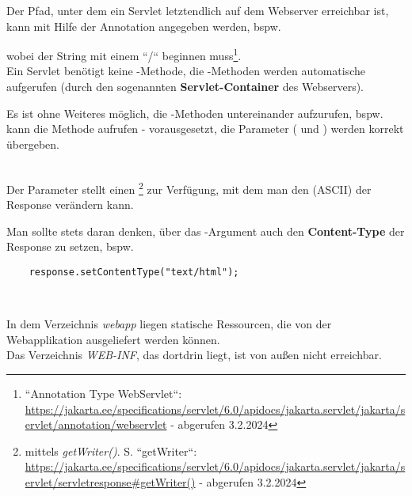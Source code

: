 \noindent
Der Pfad, unter dem ein Servlet letztendlich auf dem Webserver erreichbar ist, kann mit Hilfe der Annotation  angegeben werden, bspw. \begin{center}\end{center} wobei der String mit einem ``/`` beginnen muss\footnote{
    ``Annotation Type WebServlet``: \url{https://jakarta.ee/specifications/servlet/6.0/apidocs/jakarta.servlet/jakarta/servlet/annotation/webservlet} - abgerufen 3.2.2024
}.\\

\noindent
Ein Servlet benötigt keine -Methode, die -Methoden werden automatische aufgerufen (durch den sogenannten \textbf{Servlet-Container} des Webservers).

\begin{tcolorbox}[enlarge top by=0.5cm,enlarge bottom by=0.5cm]
    Es ist ohne Weiteres möglich, die -Methoden untereinander aufzurufen, bspw. kann  die Methode  aufrufen - vorausgesetzt, die Parameter ( und ) werden korrekt übergeben.
\end{tcolorbox}\\

\noindent
Der Parameter  stellt einen \footnote{
mittels \textit{getWriter()}. S. ``getWriter``: \url{https://jakarta.ee/specifications/servlet/6.0/apidocs/jakarta.servlet/jakarta/servlet/servletresponse#getWriter()} - abgerufen 3.2.2024
} zur Verfügung, mit dem man den  (ASCII) der Response verändern kann.

\begin{tcolorbox}[enlarge top by=0.5cm,enlarge bottom by=0.5cm]
    Man sollte stets daran denken, über das -Argument auch den \textbf{Content-Type} der Response zu setzen, bspw.
    \begin{verbatim}
    response.setContentType("text/html");
    \end{verbatim}\\
\end{tcolorbox}

\noindent
In dem Verzeichnis \textit{webapp} liegen statische Ressourcen, die von der Webapplikation ausgeliefert werden können.\\
Das Verzeichnis \textit{WEB-INF}, das dortdrin liegt, ist von außen nicht erreichbar.\\


